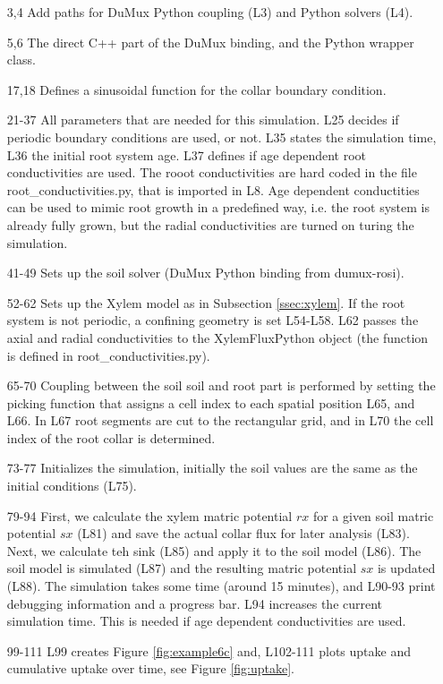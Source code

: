 \begin{itemize}

\item[3,4] Add paths for DuMux Python coupling (L3) and Python solvers (L4).

\item[5,6] The direct C++ part of the DuMux binding, and the Python wrapper class. 

\item[17,18]  Defines a sinusoidal function for the collar boundary condition.

\item[21-37] All parameters that are needed for this simulation. L25 decides if periodic boundary conditions are used, or not. L35 states the simulation time, L36 the initial root system age. L37 defines if age dependent root conductivities are used. The rooot conductivities are hard coded in the file root\_conductivities.py, that is imported in L8. Age dependent conductities can be used to mimic root growth in a predefined way, i.e. the root system is already fully grown, but the radial conductivities are turned on turing the simulation. 

\item[41-49] Sets up the soil solver (DuMux Python binding from dumux-rosi). 

\item[52-62] Sets up the Xylem model as in Subsection \ref{ssec:xylem}. If the root system is not periodic, a confining geometry is set L54-L58. L62 passes the axial and radial conductivities to the XylemFluxPython object (the function is defined in root\_conductivities.py).

\item[65-70] Coupling between the soil soil and root part is performed by setting the picking function that assigns a cell index to each spatial position L65, and L66. In L67 root segments are cut to the rectangular grid, and in L70 the cell index of the root collar is determined. 

\item[73-77] Initializes the simulation, initially the soil values are the same as the initial conditions (L75).

\item[79-94] First, we calculate the xylem matric potential $rx$ for a given soil matric potential $sx$ (L81) and save the actual collar flux for later analysis (L83). Next, we calculate teh sink (L85) and apply it to the soil model (L86). The soil model is simulated (L87) and the resulting matric potential $sx$ is updated (L88). The simulation takes some time (around 15 minutes), and L90-93 print debugging information and a progress bar. L94 increases the current simulation time. This is needed if age dependent conductivities are used. 

\item[99-111] L99 creates Figure \ref{fig:example6c} and, L102-111 plots uptake and cumulative uptake over time, see Figure \ref{fig:uptake}.

\end{itemize}


